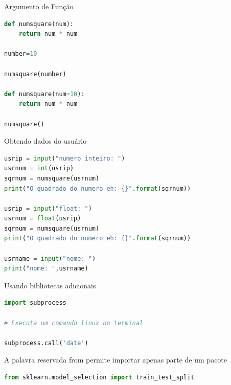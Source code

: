 \documentclass[aspectratio=169]{beamer} %
\begin{document}
\begin{SliTC}{Argumento de Função}
\begin{lstlisting}[language=python]
def numsquare(num):
    return num * num

number=10

numsquare(number)

def numsquare(num=10):
    return num * num

numsquare()
\end{lstlisting}

\end{SliTC}

\begin{SliTC}{Obtendo dados do usuário}

\begin{lstlisting}[language=python]
usrip = input("numero inteiro: ")
usrnum = int(usrip)
sqrnum = numsquare(usrnum)
print("O quadrado do numero eh: {}".format(sqrnum))

usrip = input("float: ")
usrnum = float(usrip)
sqrnum = numsquare(usrnum)
print("O quadrado do numero eh: {}".format(sqrnum))

usrname = input("nome: ")
print("nome: ",usrname)
\end{lstlisting}

\end{SliTC}

\begin{SliTC}{Usando bibliotecas adicionais}


\begin{lstlisting}[language=python]
import subprocess

# Executa um comando linux no terminal

subprocess.call('date')
\end{lstlisting}
A palavra reservada {\color{red}from} permite importar apenas parte de um pacote 
\begin{lstlisting}[language=python]
from sklearn.model_selection import train_test_split
\end{lstlisting}

\end{SliTC}

\end{document}
